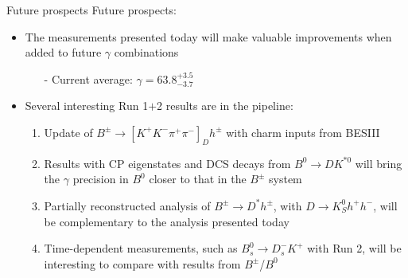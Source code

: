 \documentclass[dvipsnames]{beamer}
\begin{document}
\begin{frame}{Future prospects}
  \vspace{0.0cm}
  {\Large Future prospects:}
  \vspace{0.3cm}
  \begin{itemize}
    \setlength\itemsep{1.0em}
    \item{The measurements presented today will make valuable improvements when added to future $\gamma$ combinations}
    \begin{itemize}
      \item[-]{Current average: $\gamma = 63.8^{+3.5}_{-3.7}$}
    \end{itemize}
    \item{Several interesting Run 1$+$2 results are in the pipeline:}
    \begin{enumerate}
      \setlength\itemsep{1.0em}
      \item{Update of $B^\pm\to[K^+K^-\pi^+\pi^-]_Dh^\pm$ with charm inputs from BESIII}
      \item{Results with CP eigenstates and DCS decays from $B^0\to DK^{*0}$ will bring the $\gamma$ precision in $B^0$ closer to that in the $B^\pm$ system}
      \item{Partially reconstructed analysis of $B^\pm\to D^*h^\pm$, with $D\to K_S^0h^+h^-$, will be complementary to the analysis presented today}
      \item{Time-dependent measurements, such as $B_s^0\to D_s^-K^+$ with Run 2, will be interesting to compare with results from $B^\pm$/$B^0$}
    \end{enumerate}
  \end{itemize}
\end{frame}
\end{document}

